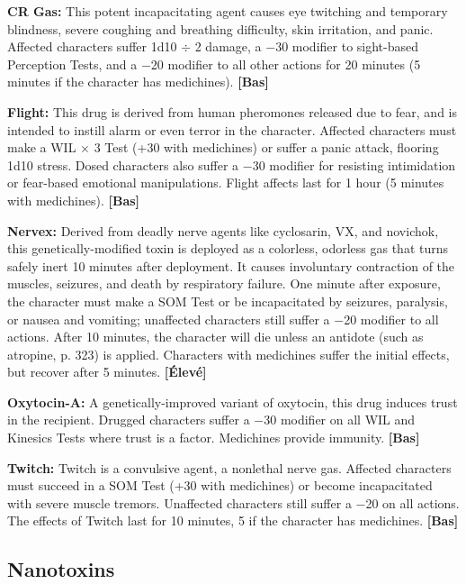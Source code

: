 {{\textbf{CR Gas:} This potent incapacitating agent causes eye twitching and temporary blindness, severe coughing and breathing difficulty, skin irritation, and panic. Affected characters suffer 1d10 $\div$ 2 damage, a $-$30 modifier to sight-based Perception Tests, and a $-$20 modifier to all other actions for 20 minutes (5 minutes if the character has medichines). \textbf{[Bas]} 

\textbf{Flight:} This drug is derived from human pheromones released due to fear, and is intended to instill alarm or even terror in the character. Affected characters must make a WIL $\times$ 3 Test (+30 with medichines) or suffer a panic attack, flooring 1d10 stress. Dosed characters also suffer a $-$30 modifier for resisting intimidation or fear-based emotional manipulations. Flight affects last for 1 hour (5 minutes with medichines). \textbf{[Bas]} 

\textbf{Nervex:} Derived from deadly nerve agents like cyclosarin, VX, and novichok, this genetically-modified toxin is deployed as a colorless, odorless gas that turns safely inert 10 minutes after deployment. It causes involuntary contraction of the muscles, seizures, and death by respiratory failure. One minute after exposure, the character must make a SOM Test or be incapacitated by seizures, paralysis, or nausea and vomiting; unaffected characters still suffer a $-$20 modifier to all actions. After 10 minutes, the character will die unless an antidote (such as atropine, p. 323) is applied. Characters with medichines suffer the initial effects, but recover after 5 minutes. \textbf{[Élevé]} 

\textbf{Oxytocin-A:} A genetically-improved variant of oxytocin, this drug induces trust in the recipient. Drugged characters suffer a $-$30 modifier on all WIL and Kinesics Tests where trust is a factor. Medichines provide immunity. \textbf{[Bas]} 

\textbf{Twitch:} Twitch is a convulsive agent, a nonlethal nerve gas. Affected characters must succeed in a SOM Test (+30 with medichines) or become incapacitated with severe muscle tremors. Unaffected characters still suffer a $-$20 on all actions. The effects of Twitch last for 10 minutes, 5 if the character has medichines. \textbf{[Bas]} 



\subsection{Nanotoxins} \label{sec:nanotoxins} 

}}
